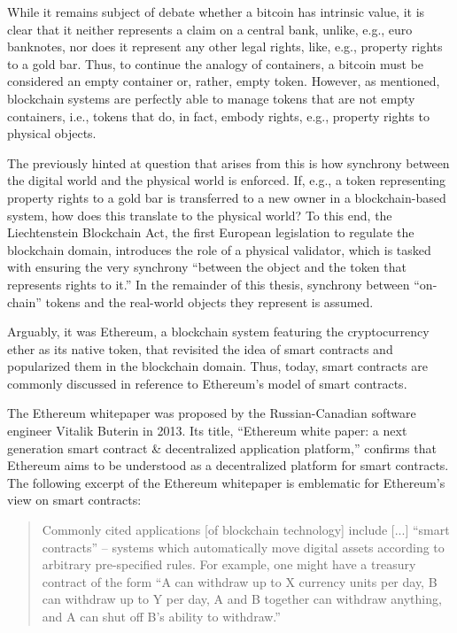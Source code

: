 While it remains subject of debate whether a bitcoin has intrinsic value, it is clear that it neither represents a claim on a central bank, unlike, e.g., euro banknotes, nor does it represent any other legal rights, like, e.g., property rights to a gold bar.
Thus, to continue the analogy of containers, a bitcoin must be considered an empty container or, rather, empty token.
However, as mentioned, blockchain systems are perfectly able to manage tokens that are not empty containers, i.e., tokens that do, in fact, embody rights, e.g., property rights to physical objects.

The previously hinted at question that arises from this is how synchrony between the digital world and the physical world is enforced.
If, e.g., a token representing property rights to a gold bar is transferred to a new owner in a blockchain-based system, how does this translate to the physical world?
To this end, the Liechtenstein Blockchain Act, the first European legislation to regulate the blockchain domain, introduces the role of a physical validator, which is tasked with ensuring the very synchrony ``between the object and the token that represents rights to it.'' \autocite[67]{naegele2019tvtg}
In the remainder of this thesis, synchrony between ``on-chain'' tokens and the real-world objects they represent is assumed.

Arguably, it was Ethereum, a blockchain system featuring the cryptocurrency ether as its native token, that revisited the idea of smart contracts and popularized them in the blockchain domain.
Thus, today, smart contracts are commonly discussed in reference to Ethereum's model of smart contracts.

The Ethereum whitepaper was proposed by the Russian-Canadian software engineer Vitalik Buterin in 2013. \autocite{blockchainlab2013ethereumwhitepaper, ethereum2021whitepaper}
Its title, ``Ethereum white paper: a next generation smart contract \& decentralized application platform,'' confirms that Ethereum aims to be understood as a decentralized platform for smart contracts.
The following excerpt of the Ethereum whitepaper is emblematic for Ethereum's view on smart contracts: \autocite[1]{blockchainlab2013ethereumwhitepaper}

\begin{quote}
  Commonly cited applications [of blockchain technology] include [...] ``smart contracts'' -- systems which automatically move digital assets according to arbitrary pre-specified rules.
  For example, one might have a treasury contract of the form ``A can withdraw up to X currency units per day, B can withdraw up to Y per day, A and B together can withdraw anything, and A can shut off B's ability to withdraw.''
\end{quote}

